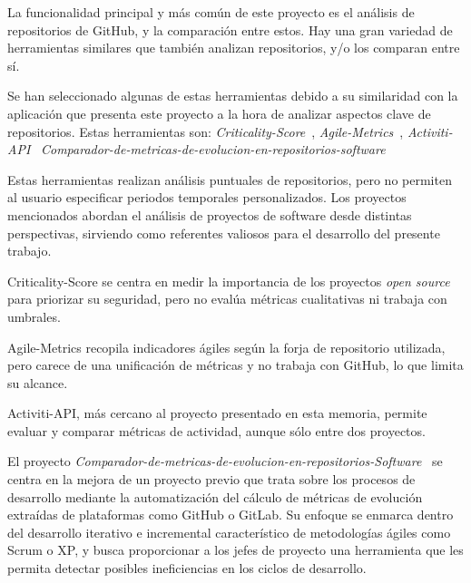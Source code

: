 
La funcionalidad principal y más común de este proyecto es el análisis de repositorios de GitHub, y la comparación entre estos. Hay una gran variedad de herramientas similares que también analizan repositorios, y/o los comparan entre sí.

Se han seleccionado algunas de estas herramientas debido a su similaridad con la aplicación que presenta este proyecto a la hora de analizar aspectos clave de repositorios. Estas herramientas son: 
\textit{Criticality-Score}~\cite{ossf_criticality_score}, 
\textit{Agile-Metrics}~\cite{dagrisa_agile_metrics}, 
\textit{Activiti-API}~\cite{dba0010_activiti_api}  
\textit{Comparador-de-metricas-de-evolucion-en-repositorios-software}~\cite{joaquin_gm_gii_o_ma}

Estas herramientas realizan análisis puntuales de repositorios, pero no permiten al usuario especificar periodos temporales personalizados. Los proyectos mencionados abordan el análisis de proyectos de software desde distintas perspectivas, sirviendo como referentes valiosos para el desarrollo del presente trabajo.

Criticality-Score se centra en medir la importancia de los proyectos \textit{open source} para priorizar su seguridad, pero no evalúa métricas cualitativas ni trabaja con umbrales.

Agile-Metrics recopila indicadores ágiles según la forja de repositorio utilizada, pero carece de una unificación de métricas y no trabaja con GitHub, lo que limita su alcance.

Activiti-API, más cercano al proyecto presentado en esta memoria, permite evaluar y comparar métricas de actividad, aunque sólo entre dos proyectos.

El proyecto \textit{Comparador-de-metricas-de-evolucion-en-repositorios-Software}~\cite{joaquin_gm_gii_o_ma} se centra en la mejora de un proyecto previo que trata sobre los procesos de desarrollo mediante la automatización del cálculo de métricas de evolución extraídas de plataformas como GitHub o GitLab. Su enfoque se enmarca dentro del desarrollo iterativo e incremental característico de metodologías ágiles como Scrum o XP, y busca proporcionar a los jefes de proyecto una herramienta que les permita detectar posibles ineficiencias en los ciclos de desarrollo.

